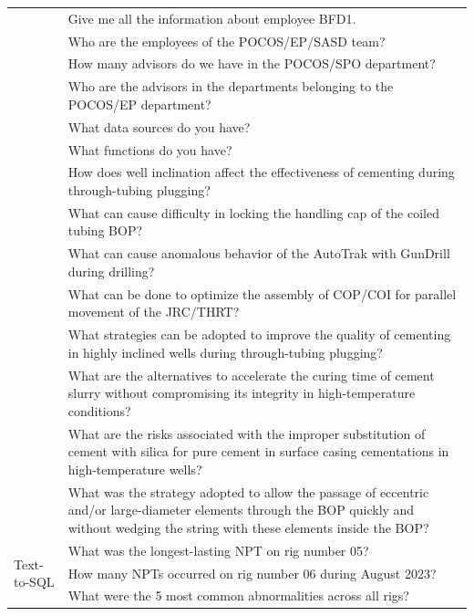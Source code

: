 \begin{table}[h]
\begin{tabular}{|p{.1\linewidth}|p{.9\linewidth}|}
                & Give me all the information about employee BFD1. \\ \cline{2-2}
                & Who are the employees of the POCOS/EP/SASD team? \\ \cline{2-2}
                & How many advisors do we have in the POCOS/SPO department? \\ \cline{2-2}
                & Who are the advisors in the departments belonging to the POCOS/EP department? \\ \cline{2-2}
                & What data sources do you have? \\ \cline{2-2}
                & What functions do you have? \\ \cline{2-2}
                & How does well inclination affect the effectiveness of cementing during through-tubing plugging? \\ \cline{2-2}
                & What can cause difficulty in locking the handling cap of the coiled tubing BOP? \\ \cline{2-2}
                & What can cause anomalous behavior of the AutoTrak with GunDrill during drilling? \\ \cline{2-2}
                & What can be done to optimize the assembly of COP/COI for parallel movement of the JRC/THRT? \\ \cline{2-2}
                & What strategies can be adopted to improve the quality of cementing in highly inclined wells during through-tubing plugging? \\ \cline{2-2}
                & What are the alternatives to accelerate the curing time of cement slurry without compromising its integrity in high-temperature conditions? \\ \cline{2-2}
                & What are the risks associated with the improper substitution of cement with silica for pure cement in surface casing cementations in high-temperature wells? \\ \cline{2-2}
                & What was the strategy adopted to allow the passage of eccentric and/or large-diameter elements through the BOP quickly and without wedging the string with these elements inside the BOP? \\ \cline{2-2}
                \hline                
                \multirow{15}{*}{Text-to-SQL} & What was the longest-lasting NPT on rig number 05? \\ \cline{2-2}
                & How many NPTs occurred on rig number 06 during August 2023? \\ \cline{2-2}
                & What were the 5 most common abnormalities across all rigs? \\ \cline{2-2}

\end{tabular}
\end{table}
